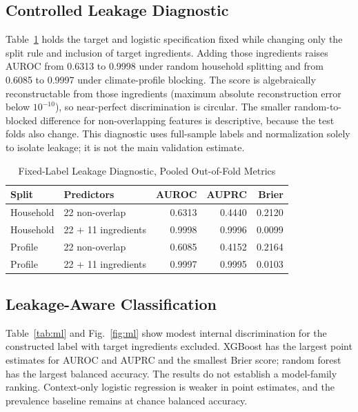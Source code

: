 \documentclass[conference,a4paper]{IEEEtran}
\begin{document}
\subsection{Controlled Leakage Diagnostic}
Table~\ref{tab:controlled} holds the target and logistic specification fixed while changing only the split rule and inclusion of target ingredients. Adding those ingredients raises AUROC from 0.6313 to 0.9998 under random household splitting and from 0.6085 to 0.9997 under climate-profile blocking. The score is algebraically reconstructable from those ingredients (maximum absolute reconstruction error below $10^{-10}$), so near-perfect discrimination is circular. The smaller random-to-blocked difference for non-overlapping features is descriptive, because the test folds also change. This diagnostic uses full-sample labels and normalization solely to isolate leakage; it is not the main validation estimate.

\begin{table}[t]
\caption{Fixed-Label Leakage Diagnostic, Pooled Out-of-Fold Metrics}
\label{tab:controlled}
\centering
\begin{tabular}{llrrr}
\toprule
Split & Predictors & AUROC & AUPRC & Brier\\
\midrule
Household & 22 non-overlap & 0.6313 & 0.4440 & 0.2120\\
Household & 22 + 11 ingredients & 0.9998 & 0.9996 & 0.0099\\
Profile & 22 non-overlap & 0.6085 & 0.4152 & 0.2164\\
Profile & 22 + 11 ingredients & 0.9997 & 0.9995 & 0.0103\\
\bottomrule
\end{tabular}
\end{table}

\subsection{Leakage-Aware Classification}
Table~\ref{tab:ml} and Fig.~\ref{fig:ml} show modest internal discrimination for the constructed label with target ingredients excluded. XGBoost has the largest point estimates for AUROC and AUPRC and the smallest Brier score; random forest has the largest balanced accuracy. The results do not establish a model-family ranking. Context-only logistic regression is weaker in point estimates, and the prevalence baseline remains at chance balanced accuracy.
\end{document}

